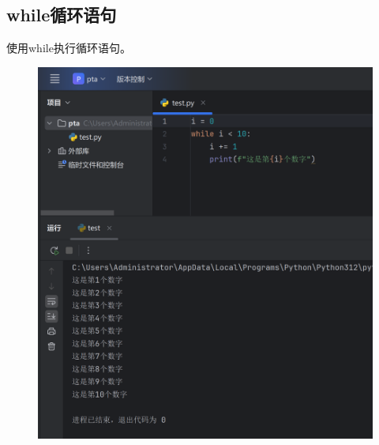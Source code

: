\documentclass{article}
\begin{document}
\subsection{while循环语句}
使用while执行循环语句。
\begin{figure}[H]
    \centering
    \includegraphics[width=1\linewidth]{while.png}
\end{figure}


\newpage
\end{document}
